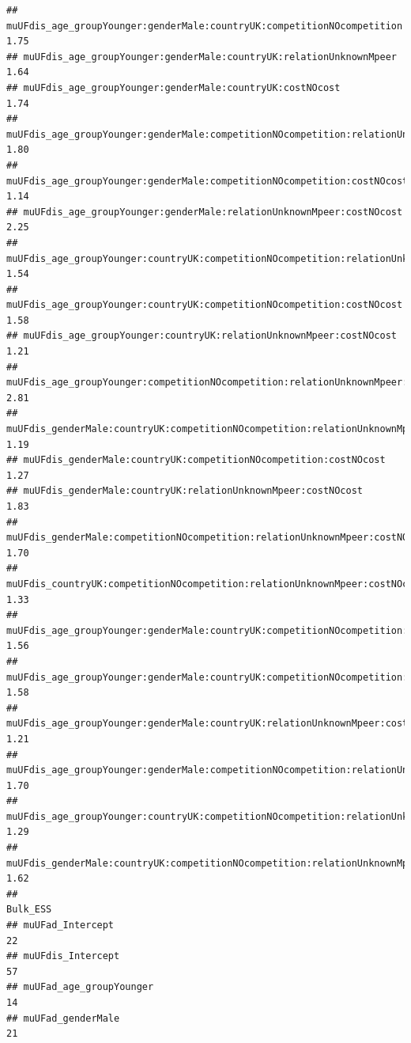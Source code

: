 \documentclass[
]{article}
\begin{document}
\begin{verbatim}
## muUFdis_age_groupYounger:genderMale:countryUK:competitionNOcompetition                       1.75
## muUFdis_age_groupYounger:genderMale:countryUK:relationUnknownMpeer                           1.64
## muUFdis_age_groupYounger:genderMale:countryUK:costNOcost                                     1.74
## muUFdis_age_groupYounger:genderMale:competitionNOcompetition:relationUnknownMpeer            1.80
## muUFdis_age_groupYounger:genderMale:competitionNOcompetition:costNOcost                      1.14
## muUFdis_age_groupYounger:genderMale:relationUnknownMpeer:costNOcost                          2.25
## muUFdis_age_groupYounger:countryUK:competitionNOcompetition:relationUnknownMpeer             1.54
## muUFdis_age_groupYounger:countryUK:competitionNOcompetition:costNOcost                       1.58
## muUFdis_age_groupYounger:countryUK:relationUnknownMpeer:costNOcost                           1.21
## muUFdis_age_groupYounger:competitionNOcompetition:relationUnknownMpeer:costNOcost            2.81
## muUFdis_genderMale:countryUK:competitionNOcompetition:relationUnknownMpeer                   1.19
## muUFdis_genderMale:countryUK:competitionNOcompetition:costNOcost                             1.27
## muUFdis_genderMale:countryUK:relationUnknownMpeer:costNOcost                                 1.83
## muUFdis_genderMale:competitionNOcompetition:relationUnknownMpeer:costNOcost                  1.70
## muUFdis_countryUK:competitionNOcompetition:relationUnknownMpeer:costNOcost                   1.33
## muUFdis_age_groupYounger:genderMale:countryUK:competitionNOcompetition:relationUnknownMpeer  1.56
## muUFdis_age_groupYounger:genderMale:countryUK:competitionNOcompetition:costNOcost            1.58
## muUFdis_age_groupYounger:genderMale:countryUK:relationUnknownMpeer:costNOcost                1.21
## muUFdis_age_groupYounger:genderMale:competitionNOcompetition:relationUnknownMpeer:costNOcost 1.70
## muUFdis_age_groupYounger:countryUK:competitionNOcompetition:relationUnknownMpeer:costNOcost  1.29
## muUFdis_genderMale:countryUK:competitionNOcompetition:relationUnknownMpeer:costNOcost        1.62
##                                                                                              Bulk_ESS
## muUFad_Intercept                                                                                   22
## muUFdis_Intercept                                                                                  57
## muUFad_age_groupYounger                                                                            14
## muUFad_genderMale                                                                                  21

\end{verbatim}
\end{document}
